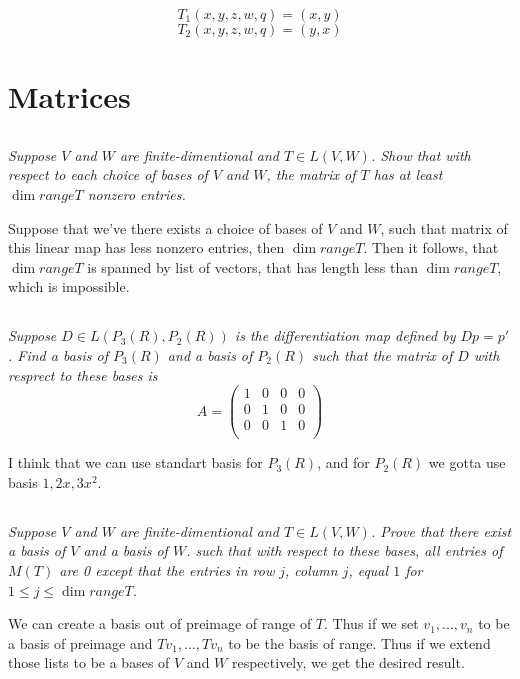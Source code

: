 \documentclass[11pt,oneside,titlepage]{book}
\begin{document}
$$T_1(x, y, z, w, q) = (x, y)$$
$$T_2(x, y, z, w, q) = (y, x)$$

\section{Matrices}

\subsection{}

\textit{Suppose $V$ and $W$ are finite-dimentional and $T \in L(V, W)$. Show that with respect
  to each choice of bases of $V$ and $W$, the matrix of $T$ has at least $\dim range T$ nonzero
  entries.}

Suppose that we've there exists a choice of bases of $V$ and $W$, such that matrix of this
linear map has less nonzero entries, then $\dim range T$. Then it follows, that
$\dim range T$ is spanned by list of vectors, that has length less than $\dim range T$,
which is impossible.


\subsection{}

\textit{Suppose $D \in L(P_3(R), P_2(R))$ is the differentiation map defined by $Dp = p'$. Find
  a basis of $P_3(R)$ and a basis of $P_2(R)$ such that the matrix of $D$ with resprect to these
  bases is }
$$
A =
\begin{pmatrix}
  1 & 0 & 0 & 0 \\
  0 & 1 & 0 & 0 \\
  0 & 0 & 1 & 0 \\
\end{pmatrix}
$$

I think that we can use standart basis for $P_3(R)$, and for $P_2(R)$ we gotta use
basis $1, 2x, 3x^2$.

\subsection{}

\textit{Suppose $V$ and $W$ are finite-dimentional and $T \in L(V, W)$. Prove that there exist
  a basis of $V$ and a basis of $W$. such that with respect to these bases, all entries of $M(T)$
  are 0 except that the entries in row $j$, column $j$, equal $1$ for
  $1 \leq j \leq \dim range T$.}

We can create a basis out of preimage of range of $T$. Thus if we set $v_1, ..., v_n$ to be a
basis of preimage and $T v_1, ..., T v_n$ to be the basis of range. Thus if we extend those
lists to be a bases of $V$ and $W$ respectively, we get the desired result.
\end{document}

